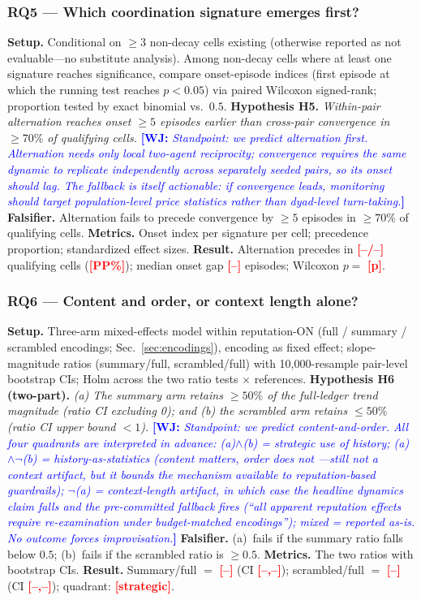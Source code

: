 \documentclass[conference]{IEEEtran}
\newcommand{\wj}[1]{\textcolor{blue}{\textbf{[WJ:} \textit{#1}\textbf{]}}}
\newcommand{\ph}[1]{\textcolor{red}{\textbf{[#1]}}}
\begin{document}
\subsubsection*{RQ5 --- Which coordination signature emerges first?}
\textbf{Setup.} Conditional on $\geq 3$ non-decay cells existing (otherwise
reported as not evaluable---no substitute analysis). Among non-decay cells
where at least one signature reaches significance, compare onset-episode
indices (first episode at which the running test reaches $p<0.05$) via paired
Wilcoxon signed-rank; proportion tested by exact binomial vs.\ $0.5$.
\textbf{Hypothesis H5.} \emph{Within-pair alternation reaches onset $\geq 5$
episodes earlier than cross-pair convergence in $\geq 70\%$ of qualifying
cells.}
\wj{Standpoint: we predict alternation first. Alternation needs only local
two-agent reciprocity; convergence requires the same dynamic to replicate
independently across separately seeded pairs, so its onset should lag. The
fallback is itself actionable: if convergence leads, monitoring should target
population-level price statistics rather than dyad-level turn-taking.}
\textbf{Falsifier.} Alternation fails to precede convergence by $\geq 5$
episodes in $\geq 70\%$ of qualifying cells.
\textbf{Metrics.} Onset index per signature per cell; precedence proportion;
standardized effect sizes.
\textbf{Result.} Alternation precedes in \ph{--/--} qualifying cells
(\ph{PP\%}); median onset gap \ph{--} episodes; Wilcoxon $p = $ \ph{p}.

\subsubsection*{RQ6 --- Content and order, or context length alone?}
\textbf{Setup.} Three-arm mixed-effects model within reputation-ON (full /
summary / scrambled encodings; Sec.~\ref{sec:encodings}), encoding as fixed
effect; slope-magnitude ratios (summary/full, scrambled/full) with
10{,}000-resample pair-level bootstrap CIs; Holm across the two ratio tests
$\times$ references.
\textbf{Hypothesis H6 (two-part).} \emph{(a) The summary arm retains
$\geq 50\%$ of the full-ledger trend magnitude (ratio CI excluding 0); and
(b) the scrambled arm retains $\leq 50\%$ (ratio CI upper bound $< 1$).}
\wj{Standpoint: we predict content-and-order. All four quadrants are
interpreted in advance: (a)$\wedge$(b) = strategic use of history;
(a)$\wedge\neg$(b) = history-as-statistics (content matters, order does not
---still not a context artifact, but it bounds the mechanism available to
reputation-based guardrails); $\neg$(a) = context-length artifact, in which
case the headline dynamics claim falls and the pre-committed fallback fires
(``all apparent reputation effects require re-examination under
budget-matched encodings''); mixed = reported as-is. No outcome forces
improvisation.}
\textbf{Falsifier.} (a)~fails if the summary ratio falls below $0.5$;
(b)~fails if the scrambled ratio is $\geq 0.5$.
\textbf{Metrics.} The two ratios with bootstrap CIs.
\textbf{Result.} Summary/full $= $ \ph{--} (CI \ph{--,--}); scrambled/full
$= $ \ph{--} (CI \ph{--,--}); quadrant: \ph{strategic}.
\end{document}

